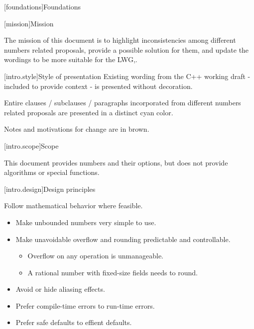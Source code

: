 
[foundations]{Foundations}

[mission]{Mission}

\iffalse %
The mission of this specification is to make numbers easier to use.
\else
The mission of this document is to highlight inconsistencies among different numbers related proposals, provide a possible solution for them, and update the wordings to be more suitable for the LWG,.
\fi

[intro.style]{Style of presentation}
Existing wording from the C++ working draft - included to provide context - is presented without decoration.

\begin{addedblock}
Entire clauses / subclauses / paragraphs incorporated from different numbers related proposals are presented in a distinct cyan
color.
\end{addedblock}




\begin{modifcommentblock}
Notes and motivations for change are in brown.
\end{modifcommentblock}

[intro.scope]{Scope}

This document provides numbers and their options, but does not provide algorithms or special functions.

[intro.design]{Design principles}

Follow mathematical behavior where feasible.

\begin{itemize}
\item Make unbounded numbers very simple to use.
\item Make unavoidable overflow and rounding predictable and controllable.
\begin{itemize}
\item Overflow on any operation is unmanageable.
\item A rational number with fixed-size fields needs to round.
\end{itemize}
\item Avoid or hide aliasing effects.
\item Prefer compile-time errors to run-time errors.
\item Prefer safe defaults to effient defaults.
\end{itemize}

